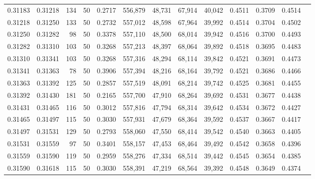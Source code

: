 \begin{tabular}{rrrrrrrrrrrrr}
0.31183 & 0.31218 &   134 &  50 &                                     0.2717 & 556,879 &  48,731 &  67,914 &  40,042 & 0.4511 & 0.3709 & 0.4514 \\
0.31218 & 0.31250 &   133 &  50 &                                     0.2732 & 557,012 &  48,598 &  67,964 &  39,992 & 0.4514 & 0.3704 & 0.4502 \\
0.31250 & 0.31282 &    98 &  50 &                                     0.3378 & 557,110 &  48,500 &  68,014 &  39,942 & 0.4516 & 0.3700 & 0.4493 \\
0.31282 & 0.31310 &   103 &  50 &                                     0.3268 & 557,213 &  48,397 &  68,064 &  39,892 & 0.4518 & 0.3695 & 0.4483 \\
0.31310 & 0.31341 &   103 &  50 &                                     0.3268 & 557,316 &  48,294 &  68,114 &  39,842 & 0.4521 & 0.3691 & 0.4473 \\
0.31341 & 0.31363 &    78 &  50 &                                     0.3906 & 557,394 &  48,216 &  68,164 &  39,792 & 0.4521 & 0.3686 & 0.4466 \\
0.31363 & 0.31392 &   125 &  50 &                                     0.2857 & 557,519 &  48,091 &  68,214 &  39,742 & 0.4525 & 0.3681 & 0.4455 \\
0.31392 & 0.31430 &   181 &  50 &                                     0.2165 & 557,700 &  47,910 &  68,264 &  39,692 & 0.4531 & 0.3677 & 0.4438 \\
0.31431 & 0.31465 &   116 &  50 &                                     0.3012 & 557,816 &  47,794 &  68,314 &  39,642 & 0.4534 & 0.3672 & 0.4427 \\
0.31465 & 0.31497 &   115 &  50 &                                     0.3030 & 557,931 &  47,679 &  68,364 &  39,592 & 0.4537 & 0.3667 & 0.4417 \\
0.31497 & 0.31531 &   129 &  50 &                                     0.2793 & 558,060 &  47,550 &  68,414 &  39,542 & 0.4540 & 0.3663 & 0.4405 \\
0.31531 & 0.31559 &    97 &  50 &                                     0.3401 & 558,157 &  47,453 &  68,464 &  39,492 & 0.4542 & 0.3658 & 0.4396 \\
0.31559 & 0.31590 &   119 &  50 &                                     0.2959 & 558,276 &  47,334 &  68,514 &  39,442 & 0.4545 & 0.3654 & 0.4385 \\
0.31590 & 0.31618 &   115 &  50 &                                     0.3030 & 558,391 &  47,219 &  68,564 &  39,392 & 0.4548 & 0.3649 & 0.4374 \\

\end{tabular}

